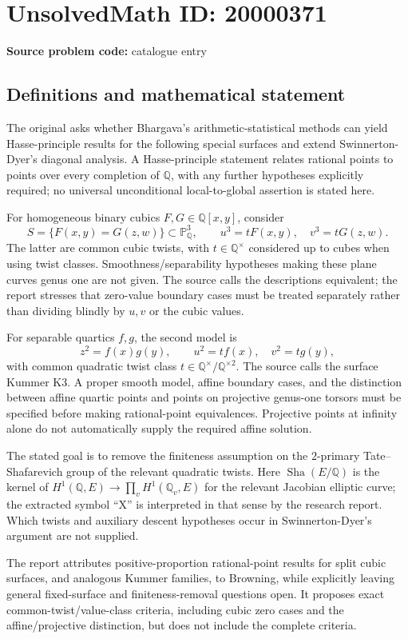 \documentclass[11pt]{article}
\newcommand{\Q}{\mathbb{Q}}
\newcommand{\PP}{\mathbb{P}}
\begin{document}
\section*{UnsolvedMath ID: 20000371}
\textbf{Source problem code:} catalogue entry
\subsection{Definitions and mathematical statement}
The original asks whether Bhargava's arithmetic-statistical methods can yield Hasse-principle results for the following special surfaces and extend Swinnerton-Dyer's diagonal analysis. A Hasse-principle statement relates rational points to points over every completion of $\Q$, with any further hypotheses explicitly required; no universal unconditional local-to-global assertion is stated here.

For homogeneous binary cubics $F,G\in\Q[x,y]$, consider
\[
 S=\{F(x,y)=G(z,w)\}\subset\PP^3_{\Q},\qquad
 u^3=tF(x,y),\quad v^3=tG(z,w).
\]
The latter are common cubic twists, with $t\in\Q^\times$ considered up to cubes when using twist classes. Smoothness/separability hypotheses making these plane curves genus one are not given. The source calls the descriptions equivalent; the report stresses that zero-value boundary cases must be treated separately rather than dividing blindly by $u,v$ or the cubic values.

For separable quartics $f,g$, the second model is
\[
 z^2=f(x)g(y),\qquad u^2=tf(x),\quad v^2=tg(y),
\]
with common quadratic twist class $t\in\Q^\times/\Q^{\times2}$. The source calls the surface Kummer K3. A proper smooth model, affine boundary cases, and the distinction between affine quartic points and points on projective genus-one torsors must be specified before making rational-point equivalences. Projective points at infinity alone do not automatically supply the required affine solution.

The stated goal is to remove the finiteness assumption on the $2$-primary Tate--Shafarevich group of the relevant quadratic twists. Here $\operatorname{Sha}(E/\Q)$ is the kernel of $H^1(\Q,E)\to\prod_vH^1(\Q_v,E)$ for the relevant Jacobian elliptic curve; the extracted symbol ``X'' is interpreted in that sense by the research report. Which twists and auxiliary descent hypotheses occur in Swinnerton-Dyer's argument are not supplied.

The report attributes positive-proportion rational-point results for split cubic surfaces, and analogous Kummer families, to Browning, while explicitly leaving general fixed-surface and finiteness-removal questions open. It proposes exact common-twist/value-class criteria, including cubic zero cases and the affine/projective distinction, but does not include the complete criteria.
\end{document}
